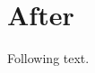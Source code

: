 \documentclass{article}
\begin{document}
\begin{abstract}First paragraph with $x+1$.

Second paragraph.\end{abstract}
\section{After}Following text.
\end{document}
